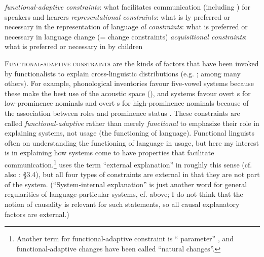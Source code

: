 \documentclass[output=paper]{langsci/langscibook}
\begin{document}
\eanoraggedright\label{ex:haspelmath:2} 
  \ea \textit{functional-adaptive constraints}: what facilitates communication (including ) for speakers and hearers
  \ex \textit{representational constraints}: what is ly preferred or necessary in the  representation of language
  \ex \textit{al constraints}: what is preferred or necessary in language change (= change constraints)
  \ex \textit{acquisitional constraints}:  what is preferred or necessary in  by children
  \z
\z

\textsc{Functional-adaptive constraints} are the kinds of factors that have been invoked by functionalists to explain cross-linguistic distributions (e.g. \citealt{Tomlin1986,Malchukov2008,Hawkins2014_VarEff}; among many others). For example, phonological inventories favour five-vowel systems because these make the best use of the acoustic space (\citealt{DeBoer2001}), and  systems favour overt s for low-prominence nominals and overt s for high-prominence nominals because of the association between roles and prominence status \citep{Dixon1994}. These constraints are called \textit{functional-adaptive} rather than merely \textit{functional} to emphasize their role in explaining systems, not usage (the functioning of language). Functional linguists often  on understanding the functioning of language in usage, but here my interest is in explaining how systems come to have properties that facilitate communication.\footnote{Another term for functional-adaptive constraint is “ parameter” \citep{DresslerEtAl1987}, and functional-adaptive changes have been called “natural changes”.} \citet{Good2008_Intro} uses the term “external explanation” in roughly this sense (cf. also \citealt{Newmeyer1998}: §3.4), but all four types of constraints are external in that they are not part of the system. (“System-internal explanation” is just another word for general regularities of language-particular systems, cf.  above; I do not think that the notion of causality is relevant for such statements, so all causal explanatory factors are external.)
\end{document}
